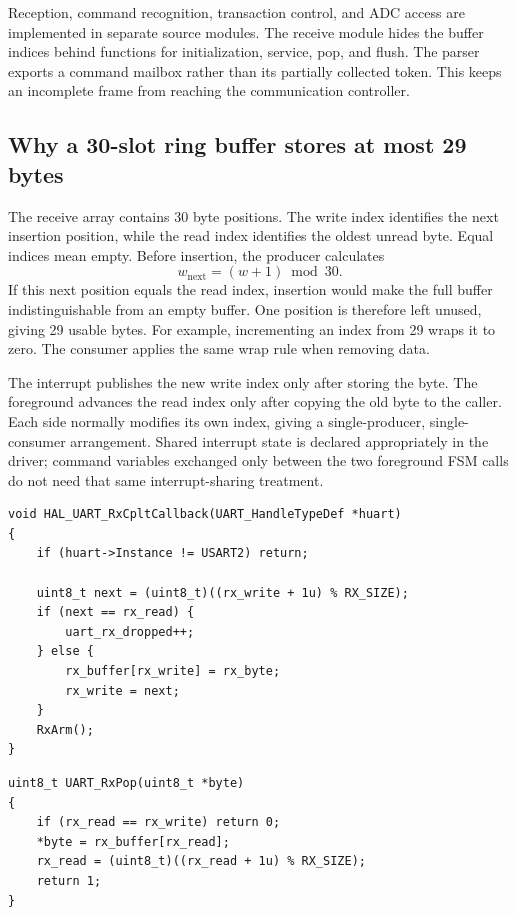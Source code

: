 \documentclass[a4paper]{article}
\newcommand{\topic}[1]{\subsection{#1}}
\begin{document}
Reception, command recognition, transaction control, and ADC access are
implemented in separate source modules.
The receive module hides the buffer indices behind functions for initialization,
service, pop, and flush. The parser exports a command mailbox rather than its
partially collected token. This keeps an incomplete frame from reaching the
communication controller.


\topic{Why a 30-slot ring buffer stores at most 29 bytes}

The receive array contains 30 byte positions. The write index identifies
the next insertion position, while the read index identifies the oldest unread
byte. Equal indices mean empty. Before insertion, the producer calculates
\[
w_{\mathrm{next}}=(w+1)\bmod30.
\]
If this next position equals the read index, insertion would make the full
buffer indistinguishable from an empty buffer. One position is therefore left
unused, giving 29 usable bytes. For example, incrementing an index from 29
wraps it to zero. The consumer applies the same wrap rule when removing data.

The interrupt publishes the new write index only after storing the byte.
The foreground advances the read index only after copying the old byte to
the caller. Each side normally modifies its own index, giving a single-producer,
single-consumer arrangement. Shared interrupt state is declared appropriately
in the driver; command variables exchanged only between the two foreground
FSM calls do not need that same interrupt-sharing treatment.


\par\noindent\begin{minipage}{\linewidth}
\begin{lstlisting}[caption={Receive completion: enqueue one byte and enable the next receive},firstnumber=1]
void HAL_UART_RxCpltCallback(UART_HandleTypeDef *huart)
{
    if (huart->Instance != USART2) return;

    uint8_t next = (uint8_t)((rx_write + 1u) % RX_SIZE);
    if (next == rx_read) {
        uart_rx_dropped++;
    } else {
        rx_buffer[rx_write] = rx_byte;
        rx_write = next;
    }
    RxArm();
}
\end{lstlisting}
\end{minipage}\par

\par\noindent\begin{minipage}{\linewidth}
\begin{lstlisting}[caption={Remove the oldest unread byte without waiting},firstnumber=1]
uint8_t UART_RxPop(uint8_t *byte)
{
    if (rx_read == rx_write) return 0;
    *byte = rx_buffer[rx_read];
    rx_read = (uint8_t)((rx_read + 1u) % RX_SIZE);
    return 1;
}
\end{lstlisting}
\end{minipage}\par
\end{document}
